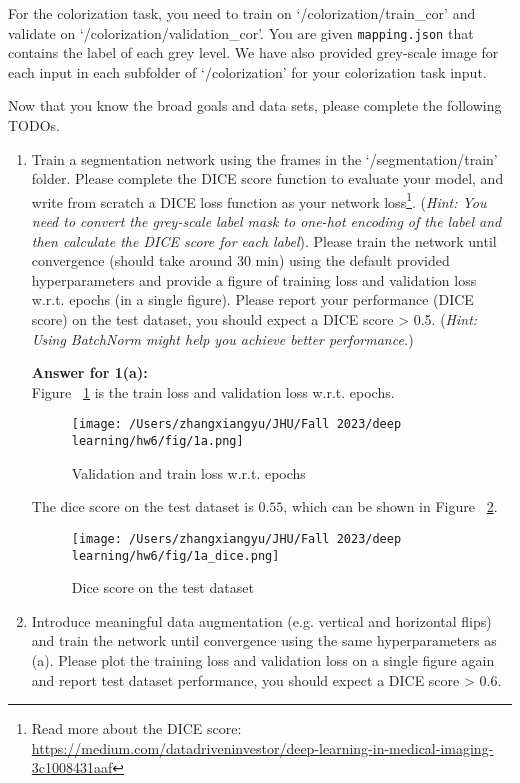 \documentclass[a4paper]{article}
\begin{document}
\begin{enumerate}
\begin{itemize}
			For the colorization task, you need to train on `/colorization/train\_cor' and validate on `/colorization/validation\_cor'. You are given \texttt{mapping.json} that contains the label of each grey level. We have also provided grey-scale image for each input in each subfolder of `/colorization' for your colorization task input.
			

		\end{itemize}
		Now that you know the broad goals and data sets, please complete the following TODOs.
		\begin{enumerate}
			\item Train a segmentation network using the frames in the `/segmentation/train' folder. Please complete the DICE score function to evaluate your model, and write from scratch a DICE loss function as your network loss\footnote{Read more about the DICE score: \url{https://medium.com/datadriveninvestor/deep-learning-in-medical-imaging-3c1008431aaf}}. (\textit{Hint: You need to convert the grey-scale label mask to one-hot encoding of the label and then calculate the DICE score for each label}). Please train the network until convergence (should take around 30 min) using the default provided hyperparameters and provide a figure of training loss and validation loss w.r.t. epochs (in a single figure). Please report your performance (DICE score) on the test dataset, you should expect a DICE score > 0.5. (\textit{Hint: Using BatchNorm might help you achieve better performance.})
			
			\noindent \textbf{Answer for 1(a):} \\
			Figure ~\ref{fig:1a}  is the train loss and validation loss w.r.t. epochs. 
			
			\begin{figure}[h!]
				\centering
				\texttt{[image: /Users/zhangxiangyu/JHU/Fall 2023/deep learning/hw6/fig/1a.png]}
				\caption{Validation and train loss w.r.t. epochs}
				\label{fig:1a}
			\end{figure}

			The dice score on the test dataset is $0.55$, which can be shown in Figure ~\ref{fig:1a_dice}.
			\begin{figure}[h!]
				\centering
				\texttt{[image: /Users/zhangxiangyu/JHU/Fall 2023/deep learning/hw6/fig/1a\_dice.png]}
				\caption{Dice score on the test dataset}
				\label{fig:1a_dice}
			\end{figure}


			\item Introduce meaningful data augmentation (e.g. vertical and horizontal flips) and train the network until convergence using the same hyperparameters as (a). Please plot the training loss and validation loss on a single figure again and report test dataset performance, you should expect a DICE score > 0.6.
			

\end{enumerate}
\end{enumerate}
\end{document}
